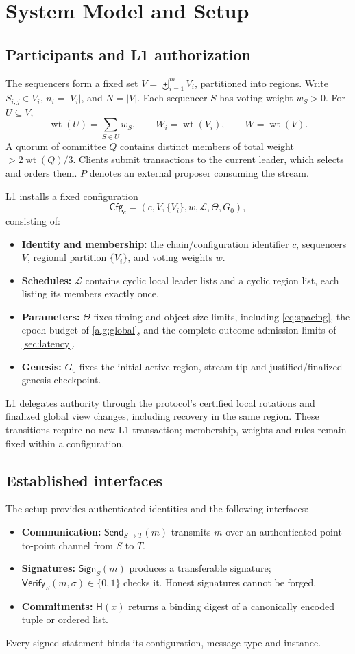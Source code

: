 \documentclass[11pt,a4paper,onecolumn]{article}
\newcommand{\Hash}{\mathsf H}
\newcommand{\Sig}{\mathsf{Sign}}
\newcommand{\Ver}{\mathsf{Verify}}
\newcommand{\Cfg}{\mathsf{Cfg}}
\newcommand{\wt}{\operatorname{wt}}
\newcommand{\Tag}[1]{\mathsf{#1}}
\theoremstyle{remark}\newtheorem{example}[definition]{Example}
\newcounter{protocol}
\begin{document}
\section{System Model and Setup}\label{sec:model}
\subsection{Participants and L1 authorization}
The sequencers form a fixed set $V=\biguplus_{i=1}^{m}V_i$, partitioned into
regions. Write $S_{i,j}\in V_i$, $n_i=|V_i|$, and $N=|V|$. Each sequencer $S$
has voting weight $w_S>0$. For $U\subseteq V$,
\[
 \wt(U)=\sum_{S\in U}w_S,\qquad W_i=\wt(V_i),\qquad W=\wt(V).
\]
A quorum of committee $Q$ contains distinct members of total weight
$>2\wt(Q)/3$. Clients submit transactions to the current leader, which selects
and orders them. $P$ denotes an external proposer consuming the stream.

L1 installs a fixed configuration
\begin{equation}\label{eq:cfg}
 \Cfg_c=(c,V,\{V_i\},w,\mathcal L,\Theta,G_0),
\end{equation}
consisting of:
\begin{itemize}
\item \textbf{Identity and membership:} the chain/configuration identifier $c$,
sequencers $V$, regional partition $\{V_i\}$, and voting weights $w$.
\item \textbf{Schedules:} $\mathcal L$ contains cyclic local leader lists and a
cyclic region list, each listing its members exactly once.
\item \textbf{Parameters:} $\Theta$ fixes timing and object-size limits,
including \eqref{eq:spacing}, the epoch budget of \cref{alg:global}, and the
complete-outcome admission limits of \cref{sec:latency}.
\item \textbf{Genesis:} $G_0$ fixes the initial active region, stream tip and
justified/finalized genesis checkpoint.
\end{itemize}
L1 delegates authority through the protocol's certified local rotations and
finalized global view changes, including recovery in the same region. These
transitions require no new L1 transaction; membership, weights and rules remain
fixed within a configuration.

\subsection{Established interfaces}
The setup provides authenticated identities and the following interfaces:
\begin{itemize}
\item \textbf{Communication:} $\Tag{Send}_{S\to T}(m)$ transmits $m$ over an
authenticated point-to-point channel from $S$ to $T$.
\item \textbf{Signatures:} $\Sig_S(m)$ produces a transferable signature;
$\Ver_S(m,\sigma)\in\{0,1\}$ checks it. Honest signatures cannot be forged.
\item \textbf{Commitments:} $\Hash(x)$ returns a binding digest of a canonically
encoded tuple or ordered list.
\end{itemize}
Every signed statement binds its configuration, message type and instance.
\end{document}
